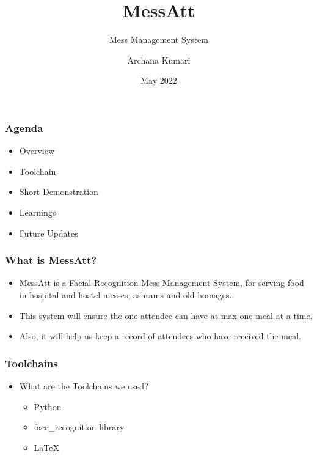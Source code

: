 \documentclass[12pt]{beamer}
\author{Archana Kumari}
\title{MessAtt}
\subtitle{Mess Management System}
\date{May 2022}
\begin{document}
\begin{frame}
\maketitle
\end{frame}

\begin{frame}
    \frametitle{Agenda} 
             \begin{itemize}
             \item {Overview}
             \item {Toolchain}
             \item {Short Demonstration}
             \item {Learnings}
             \item {Future Updates}
             \end{itemize}         
\end{frame} 

\begin{frame}
    \frametitle{What is MessAtt?}
    \begin{itemize}
        \item {MessAtt is a Facial Recognition Mess Management System, for serving food in hospital and hostel messes, ashrams and old homages.}
            \item{This system will ensure the one attendee can have at max one meal at a time.}
            \item{Also, it will help us keep a record of attendees who have received the meal.}
	\end{itemize}       
\end{frame}    
           
  
\begin{frame}
    \frametitle{Toolchains}
    \begin{itemize}          
        \item What are the Toolchains we used?
             \begin{itemize}
             \item { Python } 
      		 \item{face\_recognition library}
      		 \item { LaTeX } 
             
             \end{itemize}
             
       
    \end{itemize}       
\end{frame}  
\end{document}

